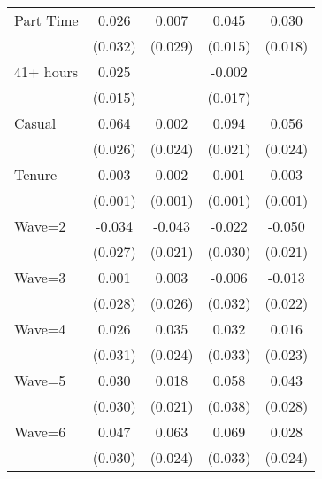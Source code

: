 {\begin{tabular}{l*{4}{c}}
Part Time           &       0.026         &       0.007         &       0.045\sym{***}&       0.030\sym{*}  \\
                    &     (0.032)         &     (0.029)         &     (0.015)         &     (0.018)         \\
41+ hours           &       0.025         &                     &      -0.002         &                     \\
                    &     (0.015)         &                     &     (0.017)         &                     \\
Casual              &       0.064\sym{**} &       0.002         &       0.094\sym{***}&       0.056\sym{**} \\
                    &     (0.026)         &     (0.024)         &     (0.021)         &     (0.024)         \\
Tenure              &       0.003\sym{**} &       0.002\sym{**} &       0.001         &       0.003\sym{***}\\
                    &     (0.001)         &     (0.001)         &     (0.001)         &     (0.001)         \\
Wave=2              &      -0.034         &      -0.043\sym{**} &      -0.022         &      -0.050\sym{**} \\
                    &     (0.027)         &     (0.021)         &     (0.030)         &     (0.021)         \\
Wave=3              &       0.001         &       0.003         &      -0.006         &      -0.013         \\
                    &     (0.028)         &     (0.026)         &     (0.032)         &     (0.022)         \\
Wave=4              &       0.026         &       0.035         &       0.032         &       0.016         \\
                    &     (0.031)         &     (0.024)         &     (0.033)         &     (0.023)         \\
Wave=5              &       0.030         &       0.018         &       0.058         &       0.043         \\
                    &     (0.030)         &     (0.021)         &     (0.038)         &     (0.028)         \\
Wave=6              &       0.047         &       0.063\sym{***}&       0.069\sym{**} &       0.028         \\
                    &     (0.030)         &     (0.024)         &     (0.033)         &     (0.024)         \\

\end{tabular}}
